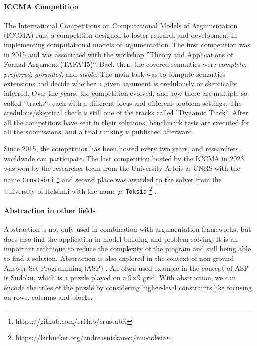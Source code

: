 \paragraph{ICCMA Competition} The International Competitions on Computational Models of Argumentation (ICCMA) runs a competition designed to foster research and development in implementing computational models of argumentation. The first competition was in 2015 and was associated with the workshop ''Theory and Applications of Formal Argument (TAFA'15)``. Back then, the covered semantics were \emph{complete}, \emph{preferred}, \emph{grounded}, and \emph{stable}. The main task was to compute semantics extensions and decide whether a given argument is credulously or skeptically inferred. Over the years, the competition evolved, and now there are multiple so-called ''tracks``, each with a different focus and different problem settings. The credulous/skeptical check is still one of the tracks called ''Dynamic Track``. After all the competitors have sent in their solutions, benchmark tests are executed for all the submissions, and a final ranking is published afterward.

Since 2015, the competition has been hosted every two years, and researchers worldwide can participate. The last competition hosted by the ICCMA in 2023 was won by the researcher team from the University Artois \& CNRS with the name \texttt{Crustabri} \footnote{https://github.com/crillab/crustabri} and second place was awarded to the solver from the University of Helsinki with the name \texttt{$\mu$-Toksia} \footnote{https://bitbucket.org/andreasniskanen/mu-toksia} \cite{DBLP:conf/kr/NiskanenJ20a}.


\paragraph{Abstraction in other fields} Abstraction is not only used in combination with argumentation frameworks, but does also find the application in model building and problem solving. It is an important technique to reduce the complexity of the program and still being able to find a solution. Abstraction is also explored in the context of non-ground Answer Set Programming (ASP) \cite{inproceedings:AbstractionInOtherDomains}. An often used example in the concept of ASP is Sudoku, which is a puzzle played on a 9$\times$9 grid. With abstraction, we can encode the rules of the puzzle by considering higher-level constraints like focusing on rows, columns and blocks.

